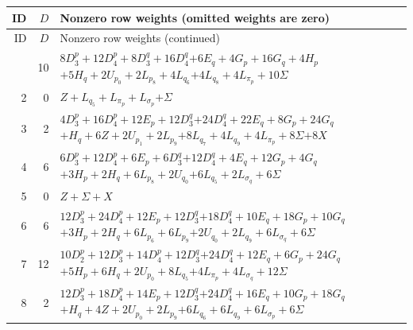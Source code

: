 \documentclass[11pt,a4paper]{article}
\theoremstyle{remark}
\begin{document}
\begingroup\footnotesize
\setlength{\tabcolsep}{4pt}
\begin{longtable}{rrp{12.7cm}}
\toprule
ID&$D$&Nonzero row weights (omitted weights are zero)\\
\midrule\endfirsthead
\toprule ID&$D$&Nonzero row weights (continued)\\\midrule\endhead
\bottomrule\endfoot
1&10&\( 8D_3^p + 12D_4^p + 8D_3^q + 16D_4^q \)\newline\( + 6E_q + 4G_p + 16G_q + 4H_p \)\newline\( + 5H_q + 2U_{p_{0}} + 2L_{p_{8}} + 4L_{q_{6}} \)\newline\( + 4L_{q_{8}} + 4L_{\pi_p} + 10\Sigma \)\\[3pt]
2&0&\( Z + L_{q_{5}} + L_{\pi_p} + L_{\sigma_p} \)\newline\( + \Sigma \)\\[3pt]
3&2&\( 4D_3^p + 16D_4^p + 12E_p + 12D_3^q \)\newline\( + 24D_4^q + 22E_q + 8G_p + 24G_q \)\newline\( + H_q + 6Z + 2U_{p_{1}} + 2L_{p_{9}} \)\newline\( + 8L_{q_{7}} + 4L_{q_{9}} + 4L_{\pi_p} + 8\Sigma \)\newline\( + 8X \)\\[3pt]
4&6&\( 6D_3^p + 12D_4^p + 6E_p + 6D_3^q \)\newline\( + 12D_4^q + 4E_q + 12G_p + 4G_q \)\newline\( + 3H_p + 2H_q + 6L_{p_{8}} + 2U_{q_{0}} \)\newline\( + 6L_{q_{5}} + 2L_{\sigma_q} + 6\Sigma \)\\[3pt]
5&0&\( Z + \Sigma + X \)\\[3pt]
6&6&\( 12D_3^p + 24D_4^p + 12E_p + 12D_3^q \)\newline\( + 18D_4^q + 10E_q + 18G_p + 10G_q \)\newline\( + 3H_p + 2H_q + 6L_{p_{6}} + 6L_{p_{9}} \)\newline\( + 2U_{q_{0}} + 2L_{q_{9}} + 6L_{\sigma_q} + 6\Sigma \)\\[3pt]
7&12&\( 10D_2^p + 12D_3^p + 14D_4^p + 12D_3^q \)\newline\( + 24D_4^q + 12E_q + 6G_p + 24G_q \)\newline\( + 5H_p + 6H_q + 2U_{p_{0}} + 8L_{q_{5}} \)\newline\( + 4L_{\pi_p} + 4L_{\sigma_q} + 12\Sigma \)\\[3pt]
8&2&\( 12D_3^p + 18D_4^p + 14E_p + 12D_3^q \)\newline\( + 24D_4^q + 16E_q + 10G_p + 18G_q \)\newline\( + H_q + 4Z + 2U_{p_{0}} + 2L_{p_{9}} \)\newline\( + 6L_{q_{6}} + 6L_{q_{9}} + 6L_{\sigma_p} + 6\Sigma \)\\[3pt]

\end{longtable}
\end{document}

